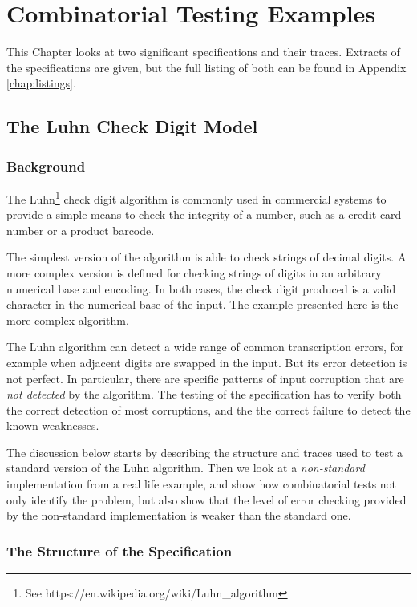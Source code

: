 \documentclass{overturerepchap}
\begin{document}
\chapter{Combinatorial Testing Examples}
\label{chap:examples}

This Chapter looks at two significant specifications and their traces.
Extracts of the specifications are given, but the full listing of both can be
found in Appendix \ref{chap:listings}.

\section{The Luhn Check Digit Model}

\subsection{Background}

The Luhn\footnote{See https://en.wikipedia.org/wiki/Luhn\_algorithm} check digit
algorithm is commonly used in commercial systems to provide a simple means to
check the integrity of a number, such as a credit card number or a product barcode.

The simplest version of the algorithm is able to check strings of decimal
digits. A more complex version is defined for checking strings of digits in an
arbitrary numerical base and encoding. In both cases, the check digit produced
is a valid character in the numerical base of the input. The example presented
here is the more complex algorithm.

The Luhn algorithm can detect a wide range of common transcription errors, for
example when adjacent digits are swapped in the input. But its error detection
is not perfect. In particular, there are specific patterns of input corruption
that are \emph{not detected} by the algorithm. The testing of the specification
has to verify both the correct detection of most corruptions, and the the
correct failure to detect the known weaknesses.

The discussion below starts by describing the structure and traces used to test
a standard version of the Luhn algorithm. Then we look at a \emph{non-standard}
implementation from a real life example, and show how combinatorial tests not
only identify the problem, but also show that the level of error checking
provided by the non-standard implementation is weaker than the standard one.

\subsection{The Structure of the Specification}
\end{document}
